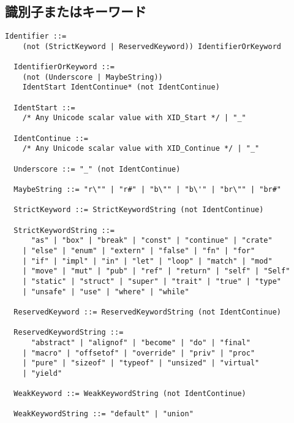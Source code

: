 \documentclass[dvipdfmx,uplatex,papersize,a4paper,10pt]{jsbook}
\theoremstyle{definition}
\begin{document}
\subsection{識別子またはキーワード}

\begin{lstlisting}[language=BNFLike, gobble=2]
  Identifier ::=
    (not (StrictKeyword | ReservedKeyword)) IdentifierOrKeyword

  IdentifierOrKeyword ::=
    (not (Underscore | MaybeString))
    IdentStart IdentContinue* (not IdentContinue)

  IdentStart ::=
    /* Any Unicode scalar value with XID_Start */ | "_"

  IdentContinue ::=
    /* Any Unicode scalar value with XID_Continue */ | "_"

  Underscore ::= "_" (not IdentContinue)

  MaybeString ::= "r\"" | "r#" | "b\"" | "b\'" | "br\"" | "br#"

  StrictKeyword ::= StrictKeywordString (not IdentContinue)

  StrictKeywordString ::=
      "as" | "box" | "break" | "const" | "continue" | "crate"
    | "else" | "enum" | "extern" | "false" | "fn" | "for"
    | "if" | "impl" | "in" | "let" | "loop" | "match" | "mod"
    | "move" | "mut" | "pub" | "ref" | "return" | "self" | "Self"
    | "static" | "struct" | "super" | "trait" | "true" | "type"
    | "unsafe" | "use" | "where" | "while"

  ReservedKeyword ::= ReservedKeywordString (not IdentContinue)

  ReservedKeywordString ::=
      "abstract" | "alignof" | "become" | "do" | "final"
    | "macro" | "offsetof" | "override" | "priv" | "proc"
    | "pure" | "sizeof" | "typeof" | "unsized" | "virtual"
    | "yield"

  WeakKeyword ::= WeakKeywordString (not IdentContinue)

  WeakKeywordString ::= "default" | "union"
\end{lstlisting}
\end{document}
